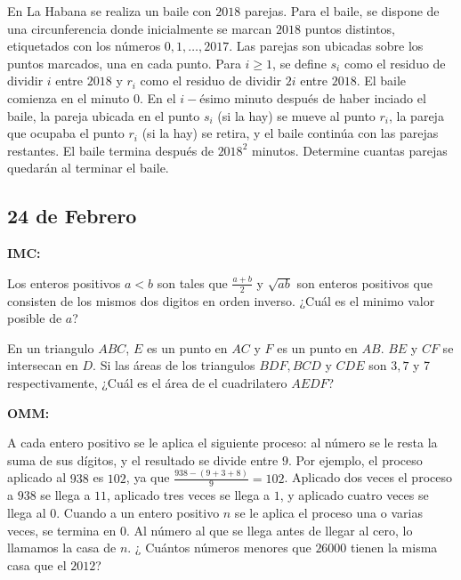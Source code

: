 \documentclass[11pt]{scrartcl}
\begin{document}
\begin{problem} [OMCC 2018/6]
    
    En La Habana se realiza un baile con $2018$ parejas. Para el baile, se dispone de una circunferencia donde inicialmente se marcan $2018$ puntos distintos, etiquetados con los números $0,1,\ldots,2017$. Las parejas son ubicadas sobre los puntos marcados, una en cada punto. Para $i\ge1$, se define $s_i$ como el residuo de dividir $i$ entre $2018$ y $r_i$ como el residuo de dividir $2i$ entre $2018$. El baile comienza en el minuto $0$. En el $i-$ésimo minuto después de haber inciado el baile, la pareja ubicada en el punto $s_i$ (si la hay) se mueve al punto $r_i$, la pareja que ocupaba el punto $r_i$ (si la hay) se retira, y el baile continúa con las parejas restantes. El baile termina después de $2018^2$ minutos. Determine cuantas parejas quedarán al terminar el baile.

    
\end{problem}

\newpage
\subsection{24 de Febrero }

\textbf{IMC:}
\begin{problem} [IMC 2013/11]
    Los enteros positivos $a<b$ son tales que $\frac{a+b}{2}$ y $\sqrt{ab}$ son enteros positivos que consisten de los mismos dos digitos en orden inverso. ¿Cuál es el minimo valor posible de $a$? 
\end{problem}

\begin{problem} [IMC 2007/3]
    En un triangulo $ABC$, $E$ es un punto en $AC$ y $F$ es un punto en $AB$. $BE$ y $CF$ se intersecan en $D$. Si las áreas de los triangulos $BDF,BCD$ y $CDE$ son $3,7$ y 7 respectivamente, ¿Cuál es el área de el cuadrilatero $AEDF$?
\end{problem}

\textbf{OMM:}
\begin{problem} [OMM 2012/4]
    
    A cada entero positivo se le aplica el siguiente proceso: al número se le resta la suma de sus dígitos, y el resultado se divide entre $9$. Por ejemplo, el proceso aplicado al $938$ es $102$, ya que  $\frac{938-(9+3+8)}{9}=102$. Aplicado dos veces el proceso a $938$ se llega a $11$, aplicado tres veces se llega a $1$, y aplicado cuatro veces se llega al $0$. Cuando a un entero positivo $n$ se le aplica el proceso una o varias veces, se termina en $0$. Al número al que se llega antes de llegar al cero, lo llamamos la casa de $n$. ¿ Cuántos
números menores que $26000$ tienen la misma casa que el $2012$?
    
\end{problem}
\end{document}
